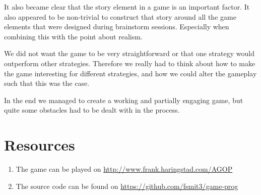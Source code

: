 \documentclass[11pt,a4paper]{article}
\begin{document}
It also became clear that the story element in a game is an important factor. It also appeared to be non-trivial to construct that story around all the game elements that were designed during brainstorm sessions. Especially when combining this with the point about realism.

We did not want the game to be very straightforward or that one strategy would outperform other strategies. Therefore we really had to think about how to make the game interesting for different strategies, and how we could alter the gameplay such that this was the case.

In the end we managed to create a working and partially engaging game, but quite some obstacles had to be dealt with in the process.

\section{Resources}
\begin{enumerate}
\item The game can be played on \url{http://www.frank.haringstad.com/AGOP}
\item The source code can be found on \url{https://github.com/fsmit3/game-prog}
\end{enumerate}
\end{document}
